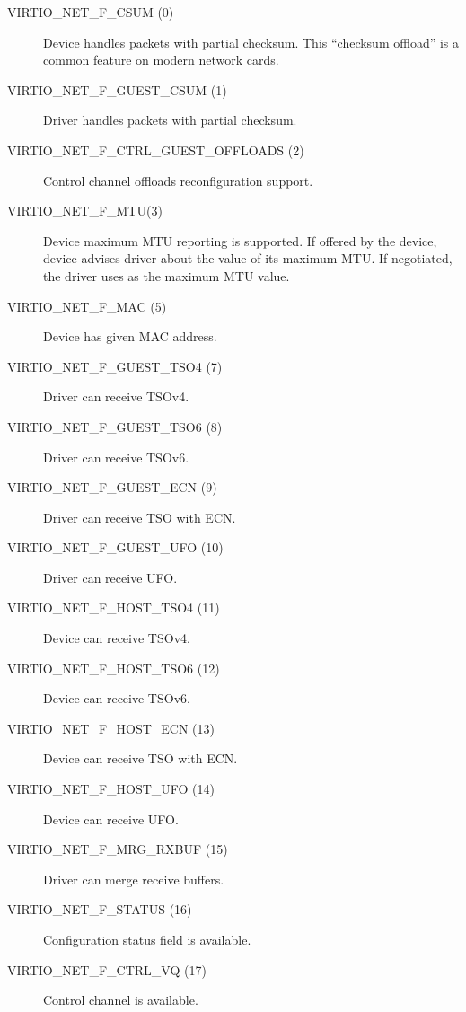 \begin{description}
\item[VIRTIO_NET_F_CSUM (0)] Device handles packets with partial checksum.   This 
  ``checksum offload'' is a common feature on modern network cards.

\item[VIRTIO_NET_F_GUEST_CSUM (1)] Driver handles packets with partial checksum.

\item[VIRTIO_NET_F_CTRL_GUEST_OFFLOADS (2)] Control channel offloads
        reconfiguration support.

\item[VIRTIO_NET_F_MTU(3)] Device maximum MTU reporting is supported. If
    offered by the device, device advises driver about the value of
    its maximum MTU. If negotiated, the driver uses  as
    the maximum MTU value.

\item[VIRTIO_NET_F_MAC (5)] Device has given MAC address.

\item[VIRTIO_NET_F_GUEST_TSO4 (7)] Driver can receive TSOv4.

\item[VIRTIO_NET_F_GUEST_TSO6 (8)] Driver can receive TSOv6.

\item[VIRTIO_NET_F_GUEST_ECN (9)] Driver can receive TSO with ECN.

\item[VIRTIO_NET_F_GUEST_UFO (10)] Driver can receive UFO.

\item[VIRTIO_NET_F_HOST_TSO4 (11)] Device can receive TSOv4.

\item[VIRTIO_NET_F_HOST_TSO6 (12)] Device can receive TSOv6.

\item[VIRTIO_NET_F_HOST_ECN (13)] Device can receive TSO with ECN.

\item[VIRTIO_NET_F_HOST_UFO (14)] Device can receive UFO.

\item[VIRTIO_NET_F_MRG_RXBUF (15)] Driver can merge receive buffers.

\item[VIRTIO_NET_F_STATUS (16)] Configuration status field is
    available.

\item[VIRTIO_NET_F_CTRL_VQ (17)] Control channel is available.


\end{description}
